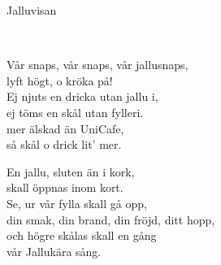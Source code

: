 \begin{song}{Jalluvisan}

	\\
	
	
	Vår snaps, vår snaps, vår jallusnaps,\\
	lyft högt, o kröka på!\\
	Ej njuts en dricka utan jallu i,\\
	ej töms en skål utan fylleri.\\
	mer älskad än UniCafe,\\
	så skål o drick lit’ mer.

	En jallu, sluten än i kork,\\
	skall öppnas inom kort.\\
	Se, ur vår fylla skall gå opp,\\
	din smak, din brand, din fröjd, ditt hopp,\\
	och högre skålas skall en gång\\
	vår Jallukära sång.
	
\end{song}
